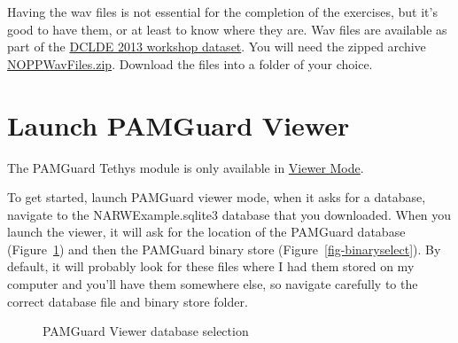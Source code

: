 \documentclass[
]{article}
\begin{document}
Having the wav files is not essential for the completion of the
exercises, but it's good to have them, or at least to know where they
are. Wav files are available as part of the
\href{https://doi.org/10.17630/62c3eebc-5574-4ec0-bfef-367ad839fe1a}{DCLDE
2013 workshop dataset}. You will need the zipped archive
\href{https://research-portal.st-andrews.ac.uk/files/264470819/NOPPWavFiles.zip}{NOPPWavFiles.zip}.
Download the files into a folder of your choice.

\section{Launch PAMGuard Viewer}\label{launch-pamguard-viewer}

The PAMGuard Tethys module is only available in
\href{https://www.pamguard.org/olhelp/overview/PamMasterHelp/docs/viewerMode.html}{Viewer
Mode}.

To get started, launch PAMGuard viewer mode, when it asks for a
database, navigate to the NARWExample.sqlite3 database that you
downloaded. When you launch the viewer, it will ask for the location of
the PAMGuard database (Figure~\ref{fig-launch}) and then the PAMGuard
binary store (Figure~\ref{fig-binaryselect}). By default, it will
probably look for these files where I had them stored on my computer and
you'll have them somewhere else, so navigate carefully to the correct
database file and binary store folder.

\begin{figure}


\caption{\label{fig-launch}PAMGuard Viewer database selection}

\end{figure}%
\end{document}

